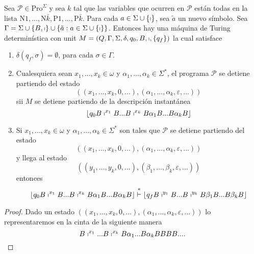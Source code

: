 	\begin{lemma}
		Sea $\mathcal{P}\in \mathrm{Pro}^{\Sigma }$ y sea $k$ tal que las variables que ocurren
    en $\mathcal{P}$ están todas en la lista $\mathrm{N}1,..., \mathrm{N}\bar{k},\mathrm{P}1,...,\mathrm{P}\bar{k}.$
    Para cada $a\in \Sigma \cup \{\shortmid \}$, sea $\tilde{a}$ un nuevo símbolo. Sea $\Gamma =\Sigma \cup \{B,
    \shortmid \}\cup \{\tilde{a}:a\in \Sigma \cup \{\shortmid \}\}$. Entonces hay una máquina de Turing determinística
    con unit $M=\left( Q,\Gamma ,\Sigma ,\delta ,q_{0},B,\shortmid ,\{q_{f}\}\right) $ la cual satisface
    \begin{enumerate}[\qquad(1)]
      \item $\delta (q_{f},\sigma )=\emptyset $, para cada $\sigma \in \Gamma $.
      \item Cualesquiera sean $x_{1},...,x_{k}\in \omega $ y $\alpha _{1},...,\alpha _{k}\in \Sigma ^{\ast }$, el
            programa $\mathcal{P}$ se detiene partiendo del estado
            \[
              \left( (x_{1},...,x_{k},0,...),(\alpha _{1},...,\alpha _{k},\varepsilon ,...)\right)
            \]
            sii $M$ se detiene partiendo de la descripción instantánea
            \[
              \left\lfloor q_{0}B\shortmid ^{x_{1}}B...B\shortmid ^{x_{k}}B\alpha _{1}B...B\alpha _{k}B\right\rfloor
            \]
      \item Si $x_{1},...,x_{k}\in \omega $ y $\alpha _{1},...,\alpha _{k}\in \Sigma ^{\ast }$ son tales que
            $\mathcal{P}$ se detiene partiendo del estado
            \[
              \left( (x_{1},...,x_{k},0,...),(\alpha _{1},...,\alpha _{k},\varepsilon ,...)\right)
            \]
            y llega al estado
            \[
              \left( (y_{1},...,y_{k},0,...),(\beta _{1},...,\beta _{k},\varepsilon ,...)\right)
            \]
            entonces
            \[
              \left\lfloor q_{0}B\shortmid ^{x_{1}}B...B\shortmid ^{x_{k}}B\alpha _{1}B...B\alpha _{k}B\right\rfloor \overset
              {\ast }{\vdash }\left\lfloor q_{f}B\shortmid ^{y_{1}}B...B\shortmid ^{y_{k}}B\beta _{1}B...B\beta _{k}B\right
              \rfloor
            \]
    \end{enumerate}


  \begin{proof}
    Dado un estado $((x_{1},...,x_{k},0,...),(\alpha _{1},...,\alpha _{k},\varepsilon ,...))$ lo representaremos en la
    cinta de la siguiente manera
    \[
      B\shortmid ^{x_{1}}...B\shortmid ^{x_{k}}B\alpha _{1}...B\alpha _{k}BBBB....
    \]


\end{proof}
\end{lemma}
